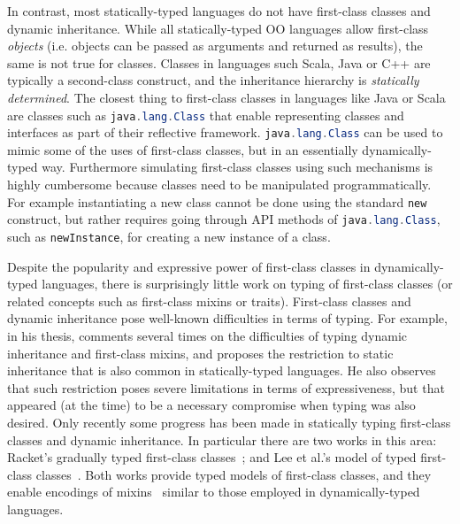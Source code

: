 In contrast, most statically-typed
languages do not have first-class classes and dynamic
inheritance. While all statically-typed OO languages allow first-class
\emph{objects} (i.e. objects can be passed as arguments and returned
as results), the same is not true for classes. Classes in languages such
Scala, Java or C++ are typically a second-class construct, and the
inheritance hierarchy is \emph{statically determined}. The closest thing
to first-class classes in
languages like Java or Scala are classes such as
\lstinline[language=java]{java.lang.Class} that enable representing classes and
interfaces as part of their reflective framework. \lstinline[language=java]{java.lang.Class} can be used to
mimic some of the uses of first-class classes, but in an essentially
dynamically-typed way. Furthermore simulating first-class classes
using such mechanisms is highly cumbersome because classes need to be
manipulated programmatically. For example instantiating a new class
cannot be done using the standard \lstinline{new} construct, but
rather requires going through API methods of
\lstinline[language=java]{java.lang.Class}, such as \lstinline{newInstance}, for
creating a new instance of a class.

Despite the popularity and expressive power of first-class classes in dynamically-typed
languages, there is surprisingly little work on typing of first-class
classes (or related concepts such as first-class mixins or traits).
First-class classes and dynamic inheritance pose well-known
difficulties in terms of typing. For example, in his thesis,
\citet{bracha1992programming} comments several times on the difficulties of typing
dynamic inheritance and first-class mixins, and proposes the
restriction to static inheritance that is also common in
statically-typed languages. He also observes that such restriction
poses severe limitations in terms of expressiveness, but that appeared
(at the time)
to be a necessary compromise when typing was also desired.
Only recently some progress has been made in statically typing
first-class classes and dynamic inheritance. In particular there are
two works in this area: Racket's gradually
typed first-class classes~\citep{DBLP:conf/oopsla/TakikawaSDTF12}; and Lee et al.'s model of
typed first-class classes~\citep{DBLP:conf/ecoop/LeeASP15}. Both works provide typed models of
first-class classes, and they enable encodings of mixins~\citep{bracha1990mixin}
similar to those employed in dynamically-typed languages.

